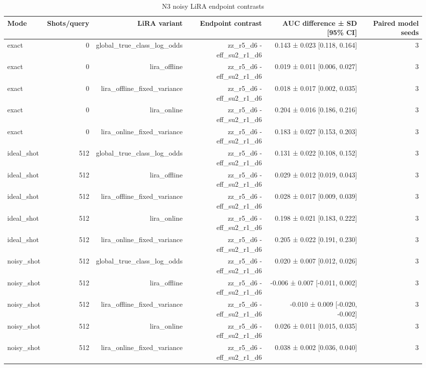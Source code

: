 \begin{table}
\caption{N3 noisy LiRA endpoint contrasts}
\label{tab:satml_noise_n3_lira}
\begin{tabular}{lrrrrr}
\toprule
Mode & Shots/query & LiRA variant & Endpoint contrast & AUC difference ± SD [95\% CI] & Paired model seeds \\
\midrule
exact & 0 & global\_true\_class\_log\_odds & zz\_r5\_d6 - eff\_su2\_r1\_d6 & 0.143 ± 0.023 [0.118, 0.164] & 3 \\
exact & 0 & lira\_offline & zz\_r5\_d6 - eff\_su2\_r1\_d6 & 0.019 ± 0.011 [0.006, 0.027] & 3 \\
exact & 0 & lira\_offline\_fixed\_variance & zz\_r5\_d6 - eff\_su2\_r1\_d6 & 0.018 ± 0.017 [0.002, 0.035] & 3 \\
exact & 0 & lira\_online & zz\_r5\_d6 - eff\_su2\_r1\_d6 & 0.204 ± 0.016 [0.186, 0.216] & 3 \\
exact & 0 & lira\_online\_fixed\_variance & zz\_r5\_d6 - eff\_su2\_r1\_d6 & 0.183 ± 0.027 [0.153, 0.203] & 3 \\
ideal\_shot & 512 & global\_true\_class\_log\_odds & zz\_r5\_d6 - eff\_su2\_r1\_d6 & 0.131 ± 0.022 [0.108, 0.152] & 3 \\
ideal\_shot & 512 & lira\_offline & zz\_r5\_d6 - eff\_su2\_r1\_d6 & 0.029 ± 0.012 [0.019, 0.043] & 3 \\
ideal\_shot & 512 & lira\_offline\_fixed\_variance & zz\_r5\_d6 - eff\_su2\_r1\_d6 & 0.028 ± 0.017 [0.009, 0.039] & 3 \\
ideal\_shot & 512 & lira\_online & zz\_r5\_d6 - eff\_su2\_r1\_d6 & 0.198 ± 0.021 [0.183, 0.222] & 3 \\
ideal\_shot & 512 & lira\_online\_fixed\_variance & zz\_r5\_d6 - eff\_su2\_r1\_d6 & 0.205 ± 0.022 [0.191, 0.230] & 3 \\
noisy\_shot & 512 & global\_true\_class\_log\_odds & zz\_r5\_d6 - eff\_su2\_r1\_d6 & 0.020 ± 0.007 [0.012, 0.026] & 3 \\
noisy\_shot & 512 & lira\_offline & zz\_r5\_d6 - eff\_su2\_r1\_d6 & -0.006 ± 0.007 [-0.011, 0.002] & 3 \\
noisy\_shot & 512 & lira\_offline\_fixed\_variance & zz\_r5\_d6 - eff\_su2\_r1\_d6 & -0.010 ± 0.009 [-0.020, -0.002] & 3 \\
noisy\_shot & 512 & lira\_online & zz\_r5\_d6 - eff\_su2\_r1\_d6 & 0.026 ± 0.011 [0.015, 0.035] & 3 \\
noisy\_shot & 512 & lira\_online\_fixed\_variance & zz\_r5\_d6 - eff\_su2\_r1\_d6 & 0.038 ± 0.002 [0.036, 0.040] & 3 \\
\bottomrule
\end{tabular}
\end{table}



